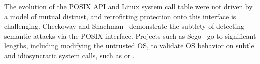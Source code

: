 The evolution of the POSIX API and Linux system call table
were not driven by a model of mutual distrust, and retrofitting
protection onto this interface is challenging.
Checkoway and Shachman~\cite{checkoway13iago} demonstrate 
the subtlety of detecting semantic attacks via the POSIX interface.
Projects such as Sego~\cite{kwon2016sego} go to significant lengths, including
modifying the untrusted OS, to validate OS behavior on subtle and idiosyncratic
system calls, such as  or .

